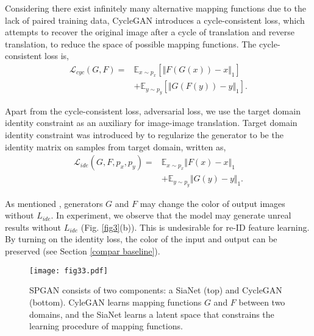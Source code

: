 \documentclass[10pt,twocolumn,letterpaper]{article}
\begin{document}
Considering there exist infinitely many alternative mapping functions due to the lack of paired training data, CycleGAN introduces a cycle-consistent loss, which attempts to recover the original image after a cycle of translation and reverse translation, to reduce the space of possible mapping functions. The cycle-consistent loss is,
\begin{equation}
\begin{split}
\mathcal{L}_{cyc}(G, F) = &\mathbb{E}_{x \sim p_{x}}[{\Vert F(G(x)) - x\Vert}_{1}]\\
&+ \mathbb{E}_{y \sim p_{y}}[{\Vert G(F(y)) - y\Vert}_{1}].
\end{split}
\label{cycle}
\end{equation}

Apart from the cycle-consistent loss, adversarial loss, we use the target domain identity constraint as an auxiliary for image-image translation. Target domain identity constraint was introduced by \cite{DBLP:journals/corr/TaigmanPW16} to regularize the generator to be the identity matrix on samples from target domain, written as,
\begin{equation}
\begin{split}
\mathcal{L}_{ide}(G, F, p_{x} , p_{y}) = &\mathbb{E}_{x \sim p_{x}}{\Vert F(x) - x \Vert}_{1}\\
&+ \mathbb{E}_{y \sim p_{y}}{\Vert G(y) - y\Vert}_{1}.
\end{split}
\end{equation}
\label{eq:Identity}

As mentioned \cite{cycle}, generators $G$ and $F$ may change the color of output images without $L_{ide}$. In experiment, we observe that the model may generate unreal results without $L_{ide}$ (Fig. \ref{fig3}(b)). 
This is undesirable for re-ID feature learning. By turning on the identity loss, the color of the input and output can be preserved (see Section \ref{compar baseline}). 
\begin{figure}[t]
\setlength{\abovecaptionskip}{0cm}
\setlength{\belowcaptionskip}{-0.3cm}
\begin{center}
\texttt{[image: fig33.pdf]}
\end{center}
\caption{SPGAN consists of two components: a  SiaNet (top) and CycleGAN (bottom). CyleGAN learns mapping functions $G$ and $F$ between two domains, and the SiaNet learns a latent space that constrains the learning procedure of mapping functions.}
\label{fig:SPGAN}
\end{figure}
\end{document}
